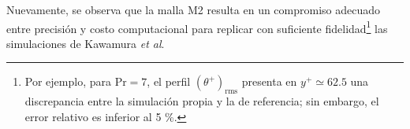 Nuevamente, se observa que la malla M2 resulta en un compromiso adecuado entre precisión y costo computacional para replicar con suficiente fidelidad\footnote{Por ejemplo, para $\text{Pr}=7$, el perfil $(\theta^+)_{\text{rms}}$ presenta en $y^+ \simeq 62\text{.}5$ una discrepancia entre la simulación propia y la de referencia; sin embargo, el error relativo es inferior al 5 \%.} las simulaciones de Kawamura \textit{et al}. 

\begin{figure}[H]
 \centering
 

\end{figure}
